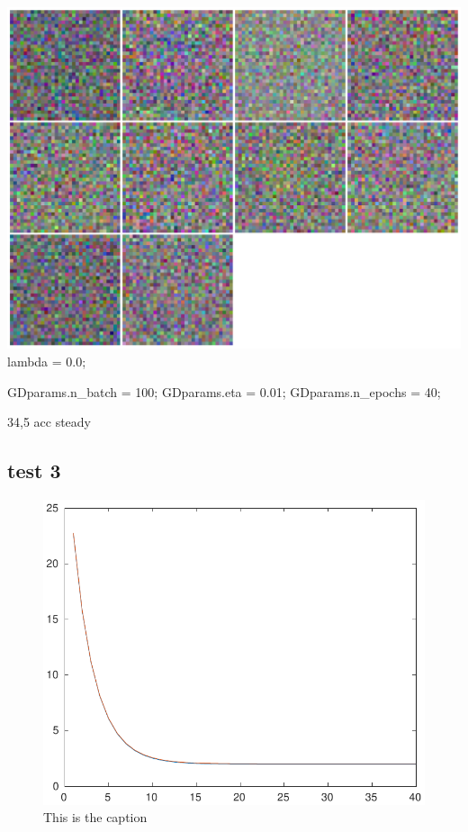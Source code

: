 \documentclass[]{article}
\begin{document}
\includegraphics{../Result_Pics/b100e40eta01la0proto.pdf} lambda = 0.0;

GDparams.n\_batch = 100; GDparams.eta = 0.01; GDparams.n\_epochs = 40;

34,5 acc steady

\subsection{test 3}\label{test-3}

\begin{figure}[h]
\centering
\includegraphics{../Result_Pics/b100e40eta01la_1.pdf}
\caption{This is the caption}
\end{figure}
\end{document}
